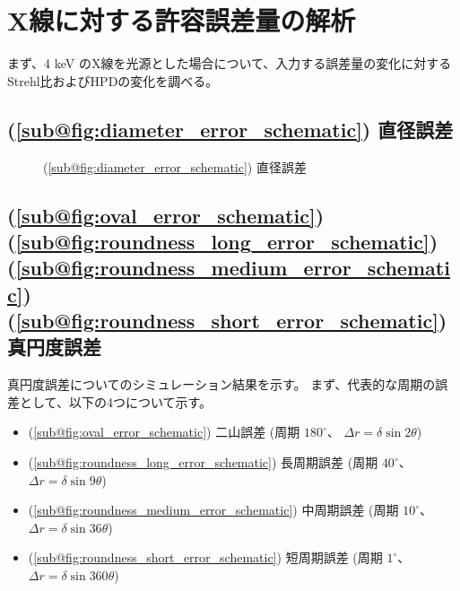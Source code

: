 \clearpage
\newpage

\section{X線に対する許容誤差量の解析}
\label{chap2_xray_allowed_error}

まず、4 keV のX線を光源とした場合について、入力する誤差量の変化に対するStrehl比およびHPDの変化を調べる。

\subsection{(\ref{sub@fig:diameter_error_schematic}) 直径誤差}
\label{chap2_xray_diameter_error}

\begin{figure}[!ht]
\centering
{}
\caption[]{(\ref{sub@fig:diameter_error_schematic}) 直径誤差}
\label{fig:diameter_allowed_error_analysis}
\end{figure}

\subsection{
    (\ref{sub@fig:oval_error_schematic})
    (\ref{sub@fig:roundness_long_error_schematic}) 
    (\ref{sub@fig:roundness_medium_error_schematic})
    (\ref{sub@fig:roundness_short_error_schematic})
    真円度誤差}
\label{chap2_xray_roundness_error}

真円度誤差についてのシミュレーション結果を示す。
まず、代表的な周期の誤差として、以下の4つについて示す。
\begin{itemize}
  \item (\ref{sub@fig:oval_error_schematic}) 二山誤差 (周期 $180^\circ$、 $\Delta r = \delta \sin 2\theta$)
  \item (\ref{sub@fig:roundness_long_error_schematic}) 長周期誤差 (周期 $40^\circ$、$\Delta r = \delta \sin 9\theta$)
  \item (\ref{sub@fig:roundness_medium_error_schematic}) 中周期誤差 (周期 $10^\circ$、$\Delta r = \delta \sin 36\theta$)
  \item (\ref{sub@fig:roundness_short_error_schematic}) 短周期誤差 (周期 $1^\circ$、$\Delta r = \delta \sin 360\theta$)
\end{itemize}

